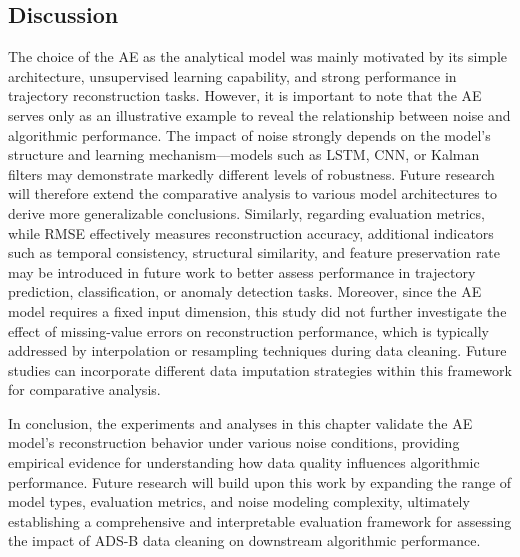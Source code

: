\subsection{Discussion}
The choice of the AE as the analytical model was mainly motivated by its simple architecture, unsupervised learning capability, and strong performance in trajectory reconstruction tasks. However, it is important to note that the AE serves only as an illustrative example to reveal the relationship between noise and algorithmic performance. The impact of noise strongly depends on the model’s structure and learning mechanism—models such as LSTM, CNN, or Kalman filters may demonstrate markedly different levels of robustness. Future research will therefore extend the comparative analysis to various model architectures to derive more generalizable conclusions.
Similarly, regarding evaluation metrics, while RMSE effectively measures reconstruction accuracy, additional indicators such as temporal consistency, structural similarity, and feature preservation rate may be introduced in future work to better assess performance in trajectory prediction, classification, or anomaly detection tasks.
Moreover, since the AE model requires a fixed input dimension, this study did not further investigate the effect of missing-value errors on reconstruction performance, which is typically addressed by interpolation or resampling techniques during data cleaning. Future studies can incorporate different data imputation strategies within this framework for comparative analysis.

In conclusion, the experiments and analyses in this chapter validate the AE model’s reconstruction behavior under various noise conditions, providing empirical evidence for understanding how data quality influences algorithmic performance.
Future research will build upon this work by expanding the range of model types, evaluation metrics, and noise modeling complexity, ultimately establishing a comprehensive and interpretable evaluation framework for assessing the impact of ADS-B data cleaning on downstream algorithmic performance.